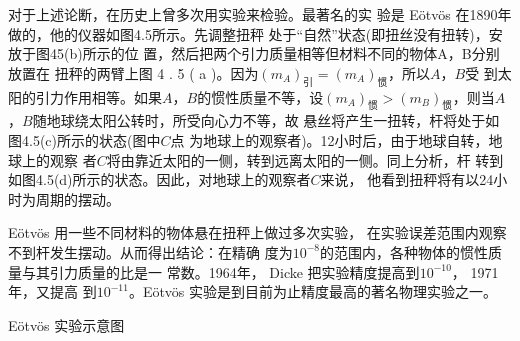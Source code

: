 对于上述论断，在历史上曾多次用实验来检验。最著名的实
验是 E\"otv\"os 在1890年做的，他的仪器如图4.5所示。先调整扭秤
处于“自然”状态(即扭丝没有扭转)，安放于图45(b)所示的位
置，然后把两个引力质量相等但材料不同的物体A，B分别放置在
扭秤的两臂上\lhbrak 图 4 . 5 ( a )\rhbrak 。因为$(m _ { A }) _ {\text{引}} = (m _ { A }) _ {\text{惯}} $，所以$ A $，$ B $受
到太阳的引力作用相等。如果$ A $，$ B $的惯性质量不等，设$  (m _ { A }) _ {\text{惯}}  > (m _ { B }) _ {\text{惯}} $，则当$ A $，$ B $随地球绕太阳公转时，所受向心力不等，故
悬丝将产生一扭转，杆将处于如图4.5(c)所示的状态(图中$ C $点
为地球上的观察者)。12小时后，由于地球自转，地球上的观察
者$ C $将由靠近太阳的一侧，转到远离太阳的一侧。同上分析，杆
转到如图4.5(d)所示的状态。因此，对地球上的观察者$ C $来说，
他看到扭秤将有以24小时为周期的摆动。

E\"otv\"os 用一些不同材料的物体悬在扭秤上做过多次实验，
在实验误差范围内观察不到杆发生摆动。从而得出结论：在精确
度为$  1 0 ^ { - 8 }   $的范围内，各种物体的惯性质量与其引力质量的比是一
常数。1964年， Dicke 把实验精度提高到$  1 0 ^ { - 1 0 }  $， 1971 年，又提高
到$  1 0 ^ { - 1 1 }  $。E\"otv\"os 实验是到目前为止精度最高的著名物理实验之一。
\begin{figurex}[t]
	\centering
	\label{fig:04.05a} \qquad
	\label{fig:04.05b}
	\label{fig:04.05c} \qquad
	\label{fig:04.05d}
	\caption{E\"otv\"os 实验示意图}
	\label{fig:04.05}
\end{figurex}


